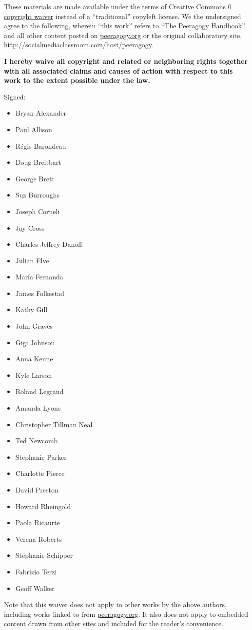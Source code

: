 These materials are made available under the terms of
\href{http://creativecommons.org/publicdomain/zero/1.0/}{Creative
Commons 0 copyright waiver} instead of a ``traditional'' copyleft
license. We the undersigned agree to the following, wherein ``this
work'' refers to ``The Peeragogy Handbook'' and all other content posted
on \href{http://peeragogy.org}{peeragogy.org} or the original
collaboratory site,
\href{http://socialmediaclassroom.com/host/peeragogy}{http://socialmediaclassroom.com/host/peeragogy}.

\bigskip
\textbf{I hereby waive all copyright and related or neighboring rights
together with all associated claims and causes of action with respect to
this work to the extent possible under the law.}

\bigskip
Signed:

\begin{itemize}
\item
  Bryan Alexander
\item
  Paul Allison
\item
  Régis Barondeau
\item
  Doug Breitbart
\item
  George Brett
\item
  Suz Burroughs
\item
  Joseph Corneli
\item
  Jay Cross
\item
  Charles Jeffrey Danoff
\item
  Julian Elve
\item
  María Fernanda
\item
  James Folkestad
\item
  Kathy Gill
\item
  John Graves
\item
  Gigi Johnson
\item
  Anna Keune
\item
  Kyle Larson
\item
  Roland Legrand
\item
  Amanda Lyons
\item
  Christopher Tillman Neal
\item
  Ted Newcomb
\item
  Stephanie Parker
\item
  Charlotte Pierce
\item
  David Preston
\item
  Howard Rheingold
\item
  Paola Ricaurte
\item
  Verena Roberts
\item
  Stephanie Schipper
\item
  Fabrizio Terzi
\item
  Geoff Walker
\end{itemize}
Note that this waiver does not apply to other works by the above
authors, including works linked to from
\href{http://peeragogy.org}{peeragogy.org}. It also does not apply to
embedded content drawn from other sites and included for the reader's
convenience.

